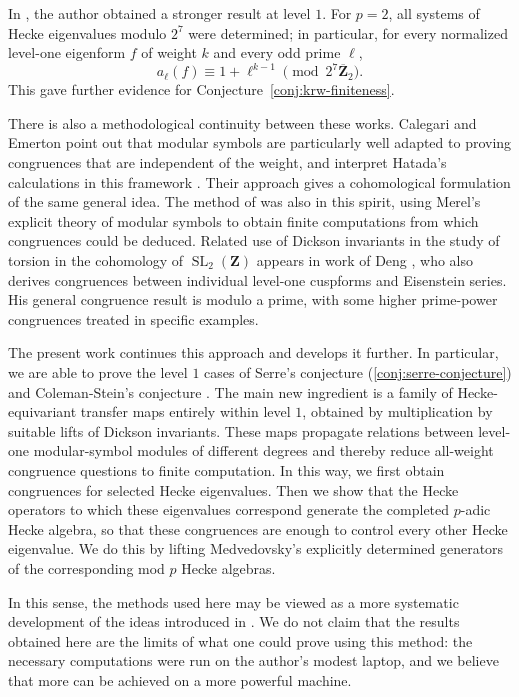 \documentclass[11pt]{article}
\theoremstyle{plain}
\theoremstyle{definition}
\theoremstyle{remark}
\numberwithin{equation}{section}
\begin{document}
In \cite{Rustom2019}, the author obtained a stronger result at level \(1\). For \(p=2\), all systems of Hecke eigenvalues modulo \(2^7\) were determined; in particular, for every normalized level-one eigenform \(f\) of weight \(k\) and every odd prime \(\ell\), \[ a_\ell(f)\equiv 1+\ell^{k-1} \pmod{2^7\overline{\mathbf Z}_2}. \] This gave further evidence for Conjecture~\ref{conj:krw-finiteness}. 

There is also a methodological continuity between these works. Calegari and Emerton point out that modular symbols are particularly well adapted to proving congruences that are independent of the weight, and interpret Hatada's calculations in this framework \cite{CalegariEmerton2004}. Their approach gives a cohomological formulation of the same general idea. The method of \cite{Rustom2019} was also in this spirit, using Merel's explicit theory of modular symbols to obtain finite computations from which congruences could be deduced. Related use of Dickson invariants in the study of torsion in the cohomology of \(\operatorname{SL}_2(\mathbf Z)\) appears in work of Deng \cite{Deng2019}, who also derives congruences between individual level-one cuspforms and Eisenstein series. His general congruence result is modulo a prime, with some higher prime-power congruences treated in specific examples.

The present work continues this approach and develops it further. In particular, we are able to prove the level \(1\) cases of Serre's conjecture (\ref{conj:serre-conjecture}) and Coleman-Stein's conjecture \cite[Conjecture~3.4]{ColemanStein2004}. The main new ingredient is a family of Hecke-equivariant transfer maps entirely within level \(1\), obtained by multiplication by suitable lifts of Dickson invariants. These maps propagate relations between level-one modular-symbol modules of different degrees and thereby reduce all-weight congruence questions to finite computation. In this way, we first obtain congruences for selected Hecke eigenvalues. Then we show that the Hecke operators to which these eigenvalues correspond generate the completed $p$-adic Hecke algebra, so that these congruences are enough to control every other Hecke eigenvalue. We do this by lifting Medvedovsky's \cite{Medvedovsky2015} explicitly determined generators of the corresponding mod $p$ Hecke algebras.

In this sense, the methods used here may be viewed as a more systematic development of the ideas introduced in \cite{Rustom2019}. We do not claim that the results obtained here are the limits of what one could prove using this method: the necessary computations were run on the author's modest laptop, and we believe that more can be achieved on a more powerful machine. 
\end{document}
